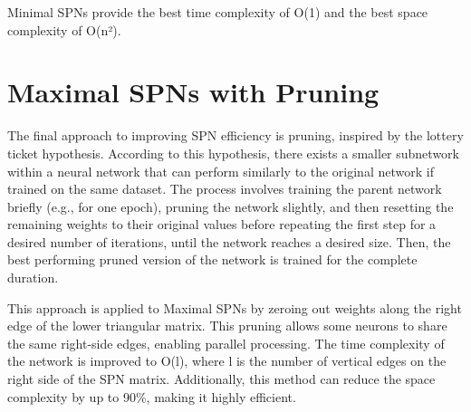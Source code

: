 Minimal SPNs provide the best time complexity of O(1) and the best space complexity of O(n²).

\section{Maximal SPNs with Pruning}

The final approach to improving SPN efficiency is pruning, inspired by the lottery ticket hypothesis. According to this hypothesis, there exists a smaller subnetwork within a neural network that can perform similarly to the original network if trained on the same dataset. The process involves training the parent network briefly (e.g., for one epoch), pruning the network slightly, and then resetting the remaining weights to their original values before repeating the first step for a desired number of iterations, until the network reaches a desired size. Then, the best performing pruned version of the network is trained for the complete duration.
 
This approach is applied to Maximal SPNs by zeroing out weights along the right edge of the lower triangular matrix. This pruning allows some neurons to share the same right-side edges, enabling parallel processing. The time complexity of the network is improved to O(l), where l is the number of vertical edges on the right side of the SPN matrix. Additionally, this method can reduce the space complexity by up to 90\%, making it highly efficient.